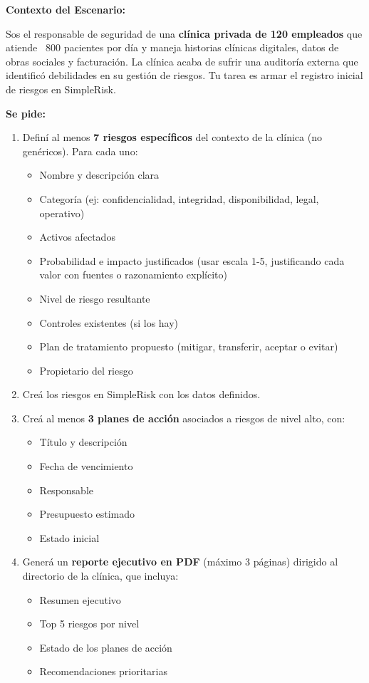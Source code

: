 \documentclass[11pt,a4paper]{article}
\begin{document}
\begin{infobox}
\textbf{Contexto del Escenario:}

Sos el responsable de seguridad de una \textbf{clínica privada de 120 empleados} que atiende ~800 pacientes por día y maneja historias clínicas digitales, datos de obras sociales y facturación. La clínica acaba de sufrir una auditoría externa que identificó debilidades en su gestión de riesgos. Tu tarea es armar el registro inicial de riesgos en SimpleRisk.
\end{infobox}

\textbf{Se pide:}

\begin{enumerate}
    \item Definí al menos \textbf{7 riesgos específicos} del contexto de la clínica (no genéricos). Para cada uno:
    \begin{itemize}
        \item Nombre y descripción clara
        \item Categoría (ej: confidencialidad, integridad, disponibilidad, legal, operativo)
        \item Activos afectados
        \item Probabilidad e impacto justificados (usar escala 1-5, justificando cada valor con fuentes o razonamiento explícito)
        \item Nivel de riesgo resultante
        \item Controles existentes (si los hay)
        \item Plan de tratamiento propuesto (mitigar, transferir, aceptar o evitar)
        \item Propietario del riesgo
    \end{itemize}
    
    \item Creá los riesgos en SimpleRisk con los datos definidos.
    
    \item Creá al menos \textbf{3 planes de acción} asociados a riesgos de nivel alto, con:
    \begin{itemize}
        \item Título y descripción
        \item Fecha de vencimiento
        \item Responsable
        \item Presupuesto estimado
        \item Estado inicial
    \end{itemize}
    
    \item Generá un \textbf{reporte ejecutivo en PDF} (máximo 3 páginas) dirigido al directorio de la clínica, que incluya:
    \begin{itemize}
        \item Resumen ejecutivo
        \item Top 5 riesgos por nivel
        \item Estado de los planes de acción
        \item Recomendaciones prioritarias
    \end{itemize}
\end{enumerate}
\end{document}
